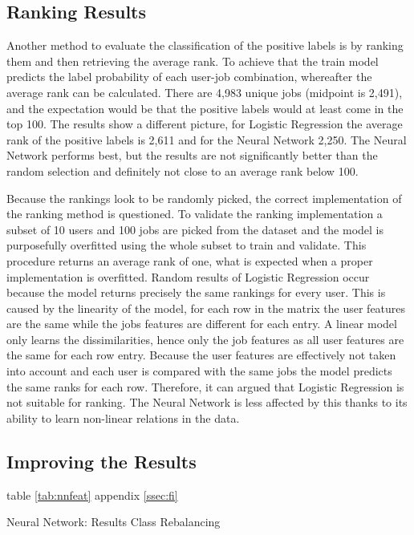 \subsection{Ranking Results}
Another method to evaluate the classification of the positive labels is by ranking them and then retrieving the average rank.
To achieve that the train model predicts the label probability of each user-job combination, whereafter the average rank can be calculated.
There are 4,983 unique jobs (midpoint is 2,491), and the expectation would be that the positive labels would at least come in the top 100. 
The results show a different picture, for Logistic Regression the average rank of the positive labels is 2,611 and for the Neural Network 2,250.
The Neural Network performs best, but the results are not significantly better than the random selection and definitely not close to an average rank below 100.

Because the rankings look to be randomly picked, the correct implementation of the ranking method is questioned. 
To validate the ranking implementation a subset of 10 users and 100 jobs are picked from the dataset and the model is purposefully overfitted using the whole subset to train and validate.
This procedure returns an average rank of one, what is expected when a proper implementation is overfitted.
Random results of Logistic Regression occur because the model returns precisely the same rankings for every user.
This is caused by the linearity of the model, for each row in the matrix the user features are the same while the jobs features are different for each entry.
A linear model only learns the dissimilarities, hence only the job features as all user features are the same for each row entry. 
Because the user features are effectively not taken into account and each user is compared with the same jobs the model predicts the same ranks for each row.
Therefore, it can argued that Logistic Regression is not suitable for ranking.
The Neural Network is less affected by this thanks to its ability to learn non-linear relations in the data. 

\subsection{Improving the Results}

table \ref{tab:nnfeat}
appendix \ref{ssec:fi}

\begin{table}[h]
\begin{footnotesize}

\end{footnotesize}
\caption{\footnotesize{\label{tab:nnci} Neural Network: Results Class Rebalancing}}
\end{table}

